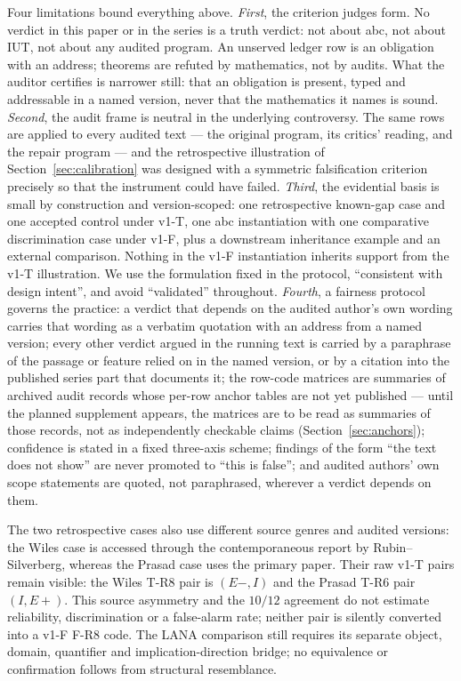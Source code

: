 \documentclass[11pt,a4paper]{article}
\begin{document}
Four limitations bound everything above. \emph{First}, the criterion judges
form. No verdict in this paper or in the series is a truth verdict: not
about abc, not about IUT, not about any audited program. An unserved
ledger row is an obligation with an address; theorems are refuted by
mathematics, not by audits. What the auditor certifies is narrower still: that
an obligation is present, typed and addressable in a named version, never that
the mathematics it names is sound. \emph{Second}, the audit frame is neutral in
the underlying controversy. The same rows are applied to every audited text ---
the original program, its critics' reading, and the repair program ---
and the retrospective illustration of Section~\ref{sec:calibration} was
designed with a symmetric falsification criterion precisely so that the
instrument could have failed. \emph{Third}, the evidential basis is small by
construction and version-scoped: one retrospective known-gap case and one
accepted control under v1-T, one abc instantiation with one comparative
discrimination case under v1-F, plus a downstream inheritance example and an
external comparison. Nothing in the v1-F instantiation inherits support from
the v1-T illustration. We use the formulation fixed in the protocol,
``consistent with design intent'', and avoid ``validated'' throughout.
\emph{Fourth}, a fairness protocol governs the
practice: a verdict that depends on the audited author's own wording
carries that wording as a verbatim quotation with an address from a named
version; every other verdict argued in the running text is carried by a
paraphrase of the passage or feature relied on in the named version, or by
a citation into the published series part that documents it; the row-code
matrices are summaries
of archived audit records whose per-row anchor tables are not yet published
--- until the planned supplement appears, the matrices are to be read as
summaries of those records, not as independently checkable claims
(Section~\ref{sec:anchors}); confidence is stated in a fixed three-axis
scheme; findings
of the form ``the text does not show'' are never promoted to ``this is
false''; and audited authors' own scope statements are quoted, not
paraphrased, wherever a verdict depends on them.

The two retrospective cases also use different source genres and audited
versions: the Wiles case is accessed through the contemporaneous report by
Rubin--Silverberg, whereas the Prasad case uses the primary paper. Their
raw v1-T pairs remain visible: the Wiles T-R8 pair is $(E-,I)$ and the
Prasad T-R6 pair $(I,E+)$. This source asymmetry and the $10/12$ agreement
do not estimate reliability, discrimination or a false-alarm rate; neither
pair is silently converted into a v1-F F-R8 code. The LANA comparison still
requires its separate object, domain, quantifier and implication-direction
bridge; no equivalence or confirmation follows from structural resemblance.
\end{document}
